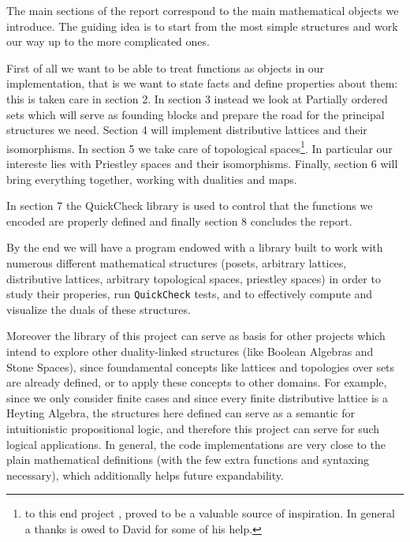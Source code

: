 The main sections of the report correspond to the main mathematical objects we introduce. The guiding idea is to start from the most simple structures and work our way up to the more complicated ones. 

First of all we want to be able to treat functions as objects in our implementation, that is we want to state facts and define properties about them: this is taken care in section 2. In section 3 instead we look at Partially ordered sets which will serve as founding blocks and prepare the road for the principal structures we need. Section 4 will implement distributive lattices and their isomorphisms. In section 5 we take care of topological spaces\footnote{to this end project \cite{quinnalvarezTopomodels2025}, proved to be a valuable source of inspiration. In general a thanks is owed to David for some of his help.}. In particular our intereste lies with Priestley spaces and their isomorphisms. Finally, section 6 will bring everything together, working with dualities and maps.

In section 7 the QuickCheck library is used to control that the functions we encoded are properly defined and finally section 8 concludes the report. 

By the end we will have a program endowed with a library built to work with numerous different mathematical structures (posets, arbitrary lattices, distributive lattices, arbitrary topological spaces, priestley spaces) in order to study their properies, run \texttt{QuickCheck} tests, and to effectively compute and visualize the duals of these structures.

Moreover the library of this project can serve as basis for other projects which intend to explore other duality-linked structures (like Boolean Algebras and Stone Spaces), since foundamental concepts like lattices and topologies over sets are already defined, or to apply these concepts to other domains. For example, since we only consider finite cases and since every finite distributive lattice is a Heyting Algebra, the structures here defined can serve as a semantic for intuitionistic propositional logic, and therefore this project can serve for such logical applications. In general, the code implementations are very close to the plain mathematical definitions (with the few extra functions and syntaxing necessary), which additionally helps future expandability.

